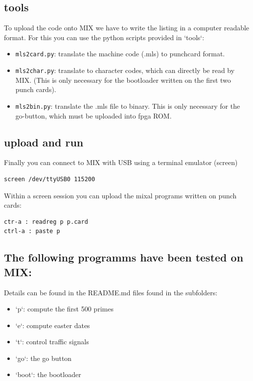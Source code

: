 \documentclass[a4paper,ngerman]{scrartcl}
\begin{document}
\subsection{tools}
To upload the code onto MIX we have to write the listing in a computer readable format. For this you can use the python scripts provided in `tools`:
\begin{itemize}
	\item \lstinline|mls2card.py|: translate the machine code (.mls) to punchcard format.
	\item  \lstinline|mls2char.py|: translate to character codes, which can directly be read by MIX. (This is only necessary for the bootloader written on the first two punch cards).
	\item  \lstinline|mls2bin.py|: translate the .mls file to binary. This is only necessary for the go-button, which must be uploaded into fpga ROM.
	 
\end{itemize}

\subsection{upload and run}
Finally you can connect to MIX with USB using a terminal emulator (screen)
\begin{lstlisting}
screen /dev/ttyUSB0 115200
\end{lstlisting}

Within  a screen session you can upload the mixal programs written on punch cards:
\begin{lstlisting}[language=bash,numbers=none]
ctr-a : readreg p p.card
ctrl-a : paste p
\end{lstlisting}


\subsection{The following programms have been tested on MIX:}

Details can be found in the README.md files found in the subfolders:
\begin{itemize}
	\item `p`: compute the first 500 primes
	\item `e`: compute easter dates
	\item  `t`: control traffic signals
	\item  `go`: the go button
	\item `boot`: the bootloader
	 
\end{itemize}
\end{document}
